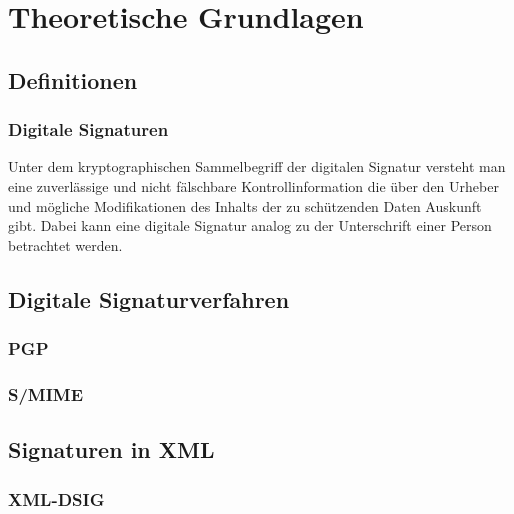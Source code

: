 \chapter{Theoretische Grundlagen}
\label{chp:TheoretischeGrundlagen}

\section{Definitionen}

\subsection{Digitale Signaturen}
Unter dem kryptographischen Sammelbegriff der digitalen Signatur versteht man eine zuverlässige und nicht fälschbare Kontrollinformation die über den Urheber
und mögliche Modifikationen des Inhalts der zu schützenden Daten Auskunft gibt\cite{itgk:bsi}. Dabei kann eine digitale Signatur analog zu der Unterschrift einer Person betrachtet werden\cite{kits}. 


\section{Digitale Signaturverfahren}
\label{sec:thg:dsv}


\subsection{PGP}
\label{sec:thg:dsv:pgp}

\subsection{S/MIME}
\label{sec:thg:dsv:smime}


\section{Signaturen in XML}
\label{sec:thg:xml}


\subsection{XML-DSIG}
\label{sec:thg:xml:dsig}
